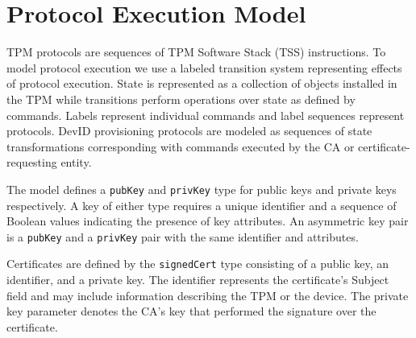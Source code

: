 \documentclass[runningheads]{llncs}
\begin{document}

\section{Protocol Execution Model}

TPM protocols are sequences of TPM Software Stack (TSS) instructions.
To model protocol execution we use a labeled transition system
representing effects of protocol execution.  State is represented as a
collection of objects installed in the TPM while transitions perform
operations over state as defined by commands.  Labels represent
individual commands and label sequences represent protocols.  DevID
provisioning protocols are modeled as sequences of state
transformations corresponding with commands executed by the CA or
certificate-requesting entity.


The model defines a \verb|pubKey| and \verb|privKey| type for public
keys and private keys respectively. A key of either type requires a
unique identifier and a sequence of Boolean values indicating the
presence of key attributes. An asymmetric key pair is a \verb|pubKey|
and a \verb|privKey| pair with the same identifier and attributes.



Certificates are defined by the \verb|signedCert| type consisting of a
public key, an identifier, and a private key. The identifier
represents the certificate's Subject field and may include information
describing the TPM or the device. The private key parameter denotes
the CA's key that performed the signature over the certificate.
\end{document}
